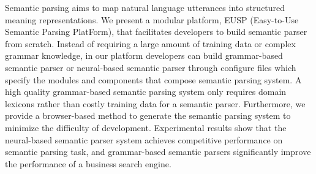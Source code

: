 Semantic parsing aims to map natural language utterances into structured meaning representations. 
We present a modular platform, EUSP (Easy-to-Use Semantic Parsing PlatForm), that facilitates developers to build semantic parser from scratch. Instead of requiring a large amount of training data or complex grammar knowledge, in our platform developers can build grammar-based semantic parser or neural-based semantic parser through configure files which specify the modules and components that compose semantic parsing system. A high quality grammar-based semantic parsing system only requires domain lexicons rather than costly training data for a semantic parser. Furthermore, we provide a browser-based method to generate the semantic parsing system to minimize the difficulty of development.
Experimental results show that the neural-based semantic parser system achieves competitive performance on semantic parsing task, and grammar-based semantic parsers significantly improve the performance of a business search engine.